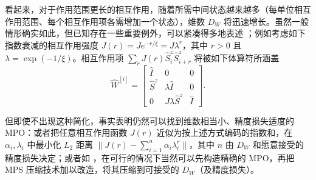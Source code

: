 \documentclass[a4paper,10pt,oneside,onecolumn,1p,times]{elsarticle}
\begin{document}
看起来，对于作用范围更长的相互作用，随着所需中间状态越来越多（每单位相互作用范围、每个相互作用项各需增加一个状态），维数 $D_W$ 将迅速增长。虽然一般情形确实如此，但已知存在一些重要例外，可以紧凑得多地表述 \cite{Frowis10,Crosswhite08a}；例如考虑如下指数衰减的相互作用强度 $J(r)=J e^{-r/\xi} = J \lambda^r$，其中 $r>0$ 且 $\lambda = \exp(-1/\xi)$。相互作用项 $\sum_r J(r)\hat{S}^z_i \hat{S}^z_{i+r}$ 将被如下体算符所涵盖
\begin{equation}
\hat{W}^{[i]} = \left[
\begin{array}{ccc}
\hat{I} & 0 & 0  \\
\hat{S}^z & \lambda\hat{I} & 0  \\
0 & J\lambda \hat{S}^z & \hat{I}
\end{array}
\right] .
\end{equation}

但即使不出现这种简化，事实表明仍然可以找到维数相当小、精度损失适度的 MPO：或者把任意相互作用函数 $J(r)$ 近似为按上述方式编码的指数和\cite{VerstraetePirvu08,Crosswhite08a}，在 $\alpha_i, \lambda_i$ 中最小化 $L_2$ 距离 $\| J(r) - \sum_{i=1}^n \alpha_i \lambda_i^r \|$，其中 $n$ 由 $D_W$ 和愿意接受的精度损失决定；或者如 \cite{Frowis10}，在可行的情况下当然可以先构造精确的 MPO，再把 MPS 压缩技术加以改造，将其压缩到可接受的 $D_W$（及精度损失）。 
\end{document}
